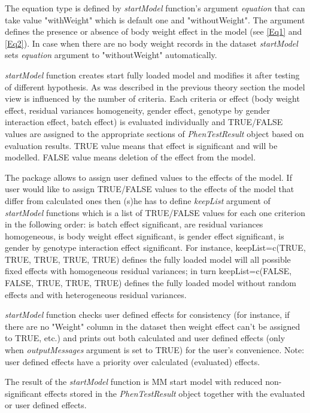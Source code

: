 \documentclass[12pt,a4paper]{article}
\begin{document}
The equation type is defined by \textit{startModel} function's argument \textit{equation} that can take value "withWeight" which is default one and "withoutWeight". The argument defines the presence or absence of body weight effect in the model (see \ref{Eq1} and \ref{Eq2}). 
In case when there are no body weight records in the dataset \textit{startModel} sets \textit{equation} argument to "withoutWeight" automatically.


\textit{startModel} function creates start fully loaded model and modifies it after testing of different hypothesis. 
As was described in the previous theory section the model view is influenced by the number of criteria. 
Each criteria or effect (body weight effect, residual variances homogeneity, gender effect, genotype by gender interaction effect, batch effect) is evaluated individually
and TRUE/FALSE values are assigned to the appropriate sections of \textit{PhenTestResult} object based on evaluation results. 
TRUE value means that effect is significant and will be modelled. FALSE value means deletion of the effect from the model.

The package allows to assign user defined values to the effects of the model. 
If user would like to assign TRUE/FALSE values to the effects of the model that differ from calculated ones then (s)he has to define \textit{keepList} argument of \textit{startModel} functions 
which is a list of TRUE/FALSE values for each one criterion in the following order: is batch effect significant, are residual variances homogeneous, is body weight effect significant, 
is gender effect significant, is gender by genotype interaction effect significant. 
For instance, keepList=c(TRUE, TRUE, TRUE, TRUE, TRUE) defines the fully loaded model will all possible fixed effects with homogeneous residual variances; 
in turn keepList=c(FALSE, FALSE, TRUE, TRUE, TRUE) defines the fully loaded model without random effects and with heterogeneous residual variances.

\textit{startModel} function checks user defined effects for consistency (for instance, if there are no "Weight" column in the dataset then weight effect can't be assigned to TRUE, etc.)
and prints out both calculated and user defined effects (only when \textit{outputMessages} argument is set to TRUE) for the user's convenience. Note: user defined effects have a priority over calculated (evaluated) effects.

The result of the \textit{startModel} function is MM start model with reduced non-significant effects stored in the \textit{PhenTestResult} object together with the evaluated or user defined effects.
\end{document}
